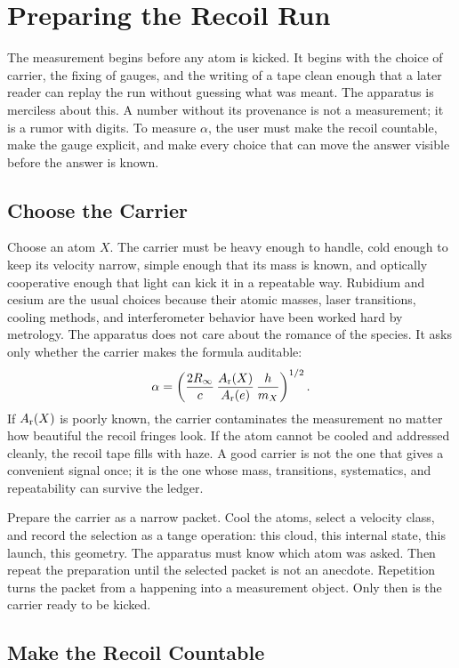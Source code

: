 \chapter{Preparing the Recoil Run}

The measurement begins before any atom is kicked. It begins with the choice of carrier, the fixing of gauges, and
the writing of a tape clean enough that a later reader can replay the run without guessing what was meant. The
apparatus is merciless about this. A number without its provenance is not a measurement; it is a rumor with
digits. To measure \(\alpha\), the user must make the recoil countable, make the gauge explicit, and make every
choice that can move the answer visible before the answer is known.

\section{Choose the Carrier}

Choose an atom \(X\). The carrier must be heavy enough to handle, cold enough to keep its velocity narrow, simple
enough that its mass is known, and optically cooperative enough that light can kick it in a repeatable way.
Rubidium and cesium are the usual choices because their atomic masses, laser transitions, cooling methods, and
interferometer behavior have been worked hard by metrology. The apparatus does not care about the romance of the
species. It asks only whether the carrier makes the formula auditable:
\[
  \alpha =
  \left(
  \frac{2R_\infty}{c}\,
  \frac{A_{\rm r}(X)}{A_{\rm r}(e)}\,
  \frac{h}{m_X}
  \right)^{1/2}.
\]
If \(A_{\rm r}(X)\) is poorly known, the carrier contaminates the measurement no matter how beautiful the recoil
fringes look. If the atom cannot be cooled and addressed cleanly, the recoil tape fills with haze. A good carrier
is not the one that gives a convenient signal once; it is the one whose mass, transitions, systematics, and
repeatability can survive the ledger.

Prepare the carrier as a narrow packet. Cool the atoms, select a velocity class, and record the selection as a
tange operation: this cloud, this internal state, this launch, this geometry. The apparatus must know which atom
was asked. Then repeat the preparation until the selected packet is not an anecdote. Repetition turns the packet
from a happening into a measurement object. Only then is the carrier ready to be kicked.

\section{Make the Recoil Countable}

